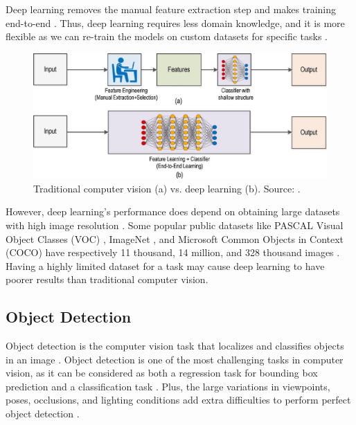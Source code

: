\documentclass[a4paper, 11pt, oneside]{article}
\begin{document}
Deep learning removes the manual feature extraction step and makes training end-to-end \cite{elgendy2020deep, o2019deep}.
Thus, deep learning requires less domain knowledge, and it is more flexible as we can re-train the models on custom
datasets for specific tasks \cite{o2019deep}.

\begin{figure}[ht]
  \begin{center}
    \includegraphics[width=.7\textwidth]{deep_learning_vs_traditional_computer_vision.png}
  \end{center}
  \caption{Traditional computer vision (a) vs. deep learning (b). Source: \cite{o2019deep}.}
\end{figure}

However, deep learning's performance does depend on obtaining large datasets with high image resolution \cite{o2019deep}.
Some popular public datasets like PASCAL Visual Object Classes (VOC) \cite{everingham2010pascal}, ImageNet
\cite{russakovsky2015imagenet}, and Microsoft Common Objects in Context (COCO) \cite{lin2014microsoft}
have respectively 11 thousand, 14 million, and 328 thousand images \cite{liu2020deep}. Having a highly limited dataset
for a task may cause deep learning to have poorer results than traditional computer vision.

\subsection{Object Detection}

\label{sec:objectdetection}

Object detection is the computer vision task that localizes and classifies objects in an image
\cite{elgendy2020deep, zhao2019object, liu2020deep, geron2019hands}. Object detection is one of the most
challenging tasks in computer vision, as it can be considered as both a regression task for bounding box prediction
and a classification task \cite{elgendy2020deep, geron2019hands, girshick2014rich}. Plus, the large variations in
viewpoints, poses, occlusions, and lighting conditions add extra difficulties to perform perfect object detection
\cite{zhao2019object, liu2020deep}.
\end{document}
